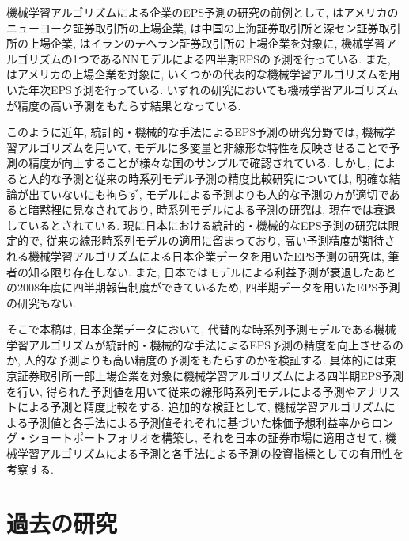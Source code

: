 \documentclass[a4paper, 12pt]{jsarticle}
\begin{document}
機械学習アルゴリズムによる企業のEPS予測の研究の前例として, \cite{zhang2004neural}はアメリカのニューヨーク証券取引所の上場企業, \cite*{cao2009forecasting} は中国の上海証券取引所と深セン証券取引所の上場企業, \cite{etemadi2015earnings}はイランのテヘラン証券取引所の上場企業を対象に, 機械学習アルゴリズムの1つであるNNモデルによる四半期EPSの予測を行っている. また, \cite*{cao2020fundamental}はアメリカの上場企業を対象に, いくつかの代表的な機械学習アルゴリズムを用いた年次EPS予測を行っている. いずれの研究においても機械学習アルゴリズムが精度の高い予測をもたらす結果となっている. 

このように近年, 統計的・機械的な手法によるEPS予測の研究分野では, 機械学習アルゴリズムを用いて, モデルに多変量と非線形な特性を反映させることで予測の精度が向上することが様々な国のサンプルで確認されている. しかし, \cite{ota2006}によると人的な予測と従来の時系列モデル予測の精度比較研究については, 明確な結論が出ていないにも拘らず, モデルによる予測よりも人的な予測の方が適切であると暗黙裡に見なされており, 時系列モデルによる予測の研究は, 現在では衰退しているとされている. 現に日本における統計的・機械的なEPS予測の研究は限定的で, 従来の線形時系列モデルの適用に留まっており, 高い予測精度が期待される機械学習アルゴリズムによる日本企業データを用いたEPS予測の研究は, 筆者の知る限り存在しない. また, 日本ではモデルによる利益予測が衰退したあとの2008年度に四半期報告制度ができているため, 四半期データを用いたEPS予測の研究もない. 

そこで本稿は, 日本企業データにおいて, 代替的な時系列予測モデルである機械学習アルゴリズムが統計的・機械的な手法によるEPS予測の精度を向上させるのか, 人的な予測よりも高い精度の予測をもたらすのかを検証する. 具体的には東京証券取引所一部上場企業を対象に機械学習アルゴリズムによる四半期EPS予測を行い, 得られた予測値を用いて従来の線形時系列モデルによる予測やアナリストによる予測と精度比較をする. 追加的な検証として, 機械学習アルゴリズムによる予測値と各手法による予測値それぞれに基づいた株価予想利益率からロング・ショートポートフォリオを構築し, それを日本の証券市場に適用させて, 機械学習アルゴリズムによる予測と各手法による予測の投資指標としての有用性を考察する. 



\part{過去の研究}
\end{document}
